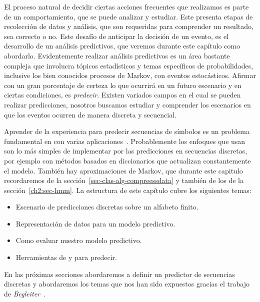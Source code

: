 El proceso natural de decidir ciertas acciones frecuentes que realizamos es parte de un comportamiento, que se puede analizar y estudiar. Este presenta etapas de recolección de datos  y análisis, que son requeridas para comprender un resultado, sea correcto o no. Este desafío de anticipar la decisión de un evento, es el desarrollo de un análisis predictivos, que veremos durante este capítulo como abordarlo. Evidentemente realizar análisis predictivos es un área bastante compleja que involucra tópicos estadísticos y temas específicos de probabilidades, inclusive los bien conocidos procesos de Markov, con eventos estocásticos. Afirmar con un gran porcentaje de certeza lo que ocurrirá en un futuro escenario y en ciertas condiciones, es \emph{predecir}. Existen variados campos en el cual se pueden realizar predicciones, nosotros buscamos estudiar y comprender los escenarios en que los eventos ocurren de manera discreta y secuencial. 
\newline

Aprender de la experiencia para predecir secuencias de símbolos es un problema fundamental en \machinelearning con varias aplicaciones~\cite{Laird1994}. Probablemente los enfoques que usan \losslessdatacompression son lo más simples de implementar por las predicciones en secuencias discretas, por ejemplo con métodos basados en diccionarios que actualizan constantemente el modelo. También hay aproximaciones de Markov, que durante este capitulo recordaremos de la sección~\ref{sec-clas-alg-compreessdata} y también de los \HMM de la sección~\ref{ch2:sec-hmm}. La estructura de este capítulo cubre los siguientes temas:
\begin{itemize}
	\menorEspacioItemize
	\item Escenario de predicciones discretas sobre un alfabeto finito.
	\item Representación de datos para un modelo predictivo.
	\item Como evaluar nuestro modelo predictivo.
	\item Herramientas de \machinelearning y \losslessdatacompression para predecir.
\end{itemize}



En las próximas secciones abordaremos a definir un predictor de secuencias discretas y abordaremos los temas que nos han sido expuestos gracias el trabajo de \emph{Begleiter}~\cite{Begleiter2004}. 

